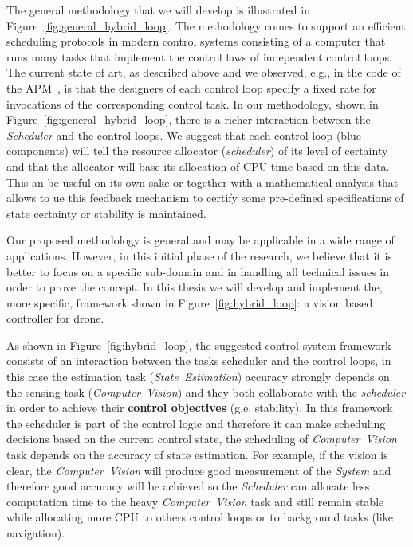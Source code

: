 \documentclass[11pt]{article}
\begin{document}
The general methodology that we will develop is illustrated in Figure~\ref{fig:general_hybrid_loop}.
The methodology comes to support an efficient scheduling protocols in modern control systems consisting of a computer that runs many tasks that implement the control laws of independent control loops. 
The current state of art, as describrd above and we observed, e.g., in the code of the APM~\cite{APM}, is that the designers of each control loop specify a fixed rate for invocations of the corresponding control task.
In our methodology, shown in Figure~\ref{fig:general_hybrid_loop}, there is a richer interaction between the \textit{Scheduler} and the control loops. We suggest that each control loop (blue components) will tell the resource allocator (\textit{scheduler}) of its level of certainty and that the allocator will base its allocation of CPU time based on this data. This an be useful on its own sake or together with a mathematical analysis that allows to ue this feedback mechanism to certify some pre-defined specifications of state certainty or stability is maintained.

Our proposed methodology is general and may be applicable in a wide range of applications. However, in this initial phase of the research, we believe that it is better to focus on a specific sub-domain and in handling all technical issues in order to prove the concept.
In this thesis we will develop and implement the, more specific, framework shown in Figure~\ref{fig:hybrid_loop}: a vision based controller for drone. 

As shown in Figure~\ref{fig:hybrid_loop}, the suggested control system framework consists of an interaction between the tasks scheduler and the control loops, in this case the estimation task (\textit{State~Estimation}) accuracy strongly depends on the sensing task (\textit{Computer~Vision}) and they both collaborate with the \textit{scheduler} in order to achieve their \textbf{control objectives} (g.e. stability).
In this framework the scheduler is part of the control logic and therefore it can make scheduling decisions based on the current control state, the scheduling of \textit{Computer~Vision} task depends on the accuracy of state estimation.
For example, if the vision is clear, the \textit{Computer~Vision} will produce good measurement of the \textit{System} and therefore good accuracy will be achieved so the \textit{Scheduler} can allocate less computation time to the heavy \textit{Computer~Vision} task and still remain stable while allocating more CPU to others control loops or to background tasks (like navigation).
\end{document}
